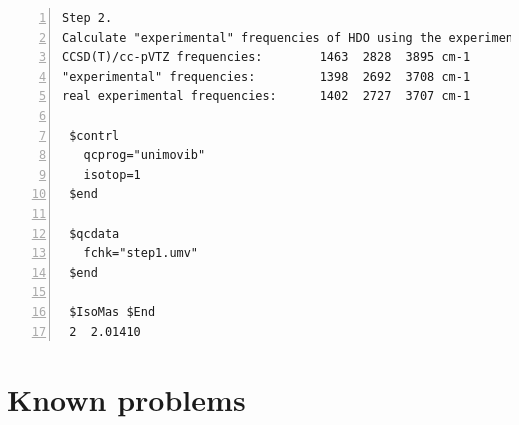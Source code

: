 \documentclass[12pt,english]{extarticle}
\begin{document}
\begin{Verbatim}[frame=single,label=example,labelposition=topline,numbers=left,rulecolor=\color{green},fontsize=\footnotesize,baselinestretch=1.0]
Step 2.
Calculate "experimental" frequencies of HDO using the experimental frequencies of H2O.
CCSD(T)/cc-pVTZ frequencies:        1463  2828  3895 cm-1
"experimental" frequencies:         1398  2692  3708 cm-1
real experimental frequencies:      1402  2727  3707 cm-1

 $contrl
   qcprog="unimovib"
   isotop=1
 $end

 $qcdata
   fchk="step1.umv"
 $end

 $IsoMas $End
 2  2.01410
\end{Verbatim}


\pagebreak{}


\section{Known problems} \label{part:problem}
\end{document}
